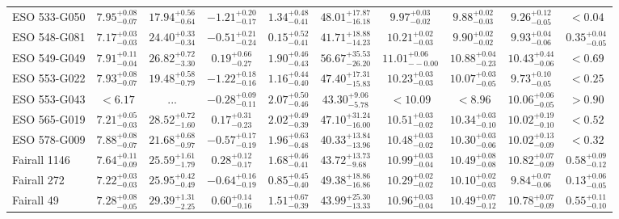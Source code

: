 \documentclass[onecolumn]{mn2e}
\begin{document}
\begin{landscape}
{\begin{center}
\begin{longtable}{lccccccccc}
ESO 533-G050 & $7.95_{-0.07}^{+0.08}$ & $17.94_{-0.64}^{+0.56}$ & $-1.21_{-0.17}^{+0.20}$ & $1.34_{-0.41}^{+0.48}$ &$48.01_{-16.18}^{+17.87}$ & $9.97_{-0.02}^{+0.03}$ & $9.88_{-0.03}^{+0.02}$ & $9.26_{-0.05}^{+0.12}$ & $<0.04$ \\
ESO 548-G081 & $7.17_{-0.03}^{+0.03}$ & $24.40_{-0.34}^{+0.33}$ & $-0.51_{-0.24}^{+0.21}$ & $0.15_{-0.41}^{+0.52}$ &$41.71_{-14.23}^{+18.88}$ & $10.21_{-0.03}^{+0.02}$ & $9.90_{-0.02}^{+0.02}$ & $9.93_{-0.06}^{+0.04}$ & $0.35_{-0.05}^{+0.04}$ \\
ESO 549-G049 & $7.91_{-0.04}^{+0.11}$ & $26.82_{-3.30}^{+0.72}$ & $0.19_{-0.27}^{+0.66}$ & $1.90_{-0.43}^{+0.46}$ &$56.67_{-26.20}^{+35.53}$ & $11.01_{--0.00}^{+0.06}$ & $10.88_{-0.23}^{+0.04}$ & $10.43_{-0.06}^{+0.44}$ & $<0.69$ \\
ESO 553-G022 & $7.93_{-0.07}^{+0.08}$ & $19.48_{-0.79}^{+0.58}$ & $-1.22_{-0.16}^{+0.18}$ & $1.16_{-0.40}^{+0.44}$ &$47.40_{-15.83}^{+17.31}$ & $10.23_{-0.03}^{+0.03}$ & $10.07_{-0.05}^{+0.03}$ & $9.73_{-0.05}^{+0.10}$ & $<0.25$ \\
ESO 553-G043 & $<6.17$ & ... & $-0.28_{-0.11}^{+0.09}$ & $2.07_{-0.46}^{+0.50}$ &$43.30_{-5.78}^{+9.06}$ & $<10.09$ & $<8.96$ & $10.06_{-0.05}^{+0.06}$ & $>0.90$ \\
ESO 565-G019 & $7.21_{-0.03}^{+0.05}$ & $28.52_{-1.60}^{+0.72}$ & $0.17_{-0.23}^{+0.31}$ & $2.02_{-0.39}^{+0.49}$ &$47.10_{-16.00}^{+31.24}$ & $10.51_{-0.02}^{+0.03}$ & $10.34_{-0.10}^{+0.03}$ & $10.02_{-0.10}^{+0.19}$ & $<0.52$ \\
ESO 578-G009 & $7.88_{-0.07}^{+0.08}$ & $21.68_{-0.97}^{+0.68}$ & $-0.57_{-0.19}^{+0.17}$ & $1.96_{-0.48}^{+0.63}$ &$40.33_{-13.96}^{+13.84}$ & $10.48_{-0.02}^{+0.03}$ & $10.30_{-0.06}^{+0.03}$ & $10.02_{-0.09}^{+0.13}$ & $<0.32$ \\
Fairall 1146 & $7.64_{-0.09}^{+0.11}$ & $25.59_{-1.79}^{+1.61}$ & $0.28_{-0.17}^{+0.12}$ & $1.68_{-0.41}^{+0.46}$ &$43.72_{-9.68}^{+13.73}$ & $10.99_{-0.04}^{+0.03}$ & $10.49_{-0.08}^{+0.08}$ & $10.82_{-0.09}^{+0.07}$ & $0.58_{-0.12}^{+0.09}$ \\
Fairall 272 & $7.22_{-0.03}^{+0.03}$ & $25.95_{-0.49}^{+0.42}$ & $-0.64_{-0.19}^{+0.16}$ & $0.85_{-0.40}^{+0.45}$ &$49.38_{-16.86}^{+18.86}$ & $10.29_{-0.02}^{+0.02}$ & $10.10_{-0.03}^{+0.02}$ & $9.84_{-0.06}^{+0.07}$ & $0.13_{-0.05}^{+0.06}$ \\
Fairall 49 & $7.28_{-0.05}^{+0.08}$ & $29.39_{-2.25}^{+1.31}$ & $0.60_{-0.16}^{+0.14}$ & $1.51_{-0.39}^{+0.67}$ &$43.99_{-13.33}^{+25.30}$ & $10.96_{-0.04}^{+0.03}$ & $10.49_{-0.12}^{+0.07}$ & $10.78_{-0.09}^{+0.07}$ & $0.55_{-0.10}^{+0.11}$ \\

\end{longtable}
\end{center}}
\end{landscape}
\end{document}
